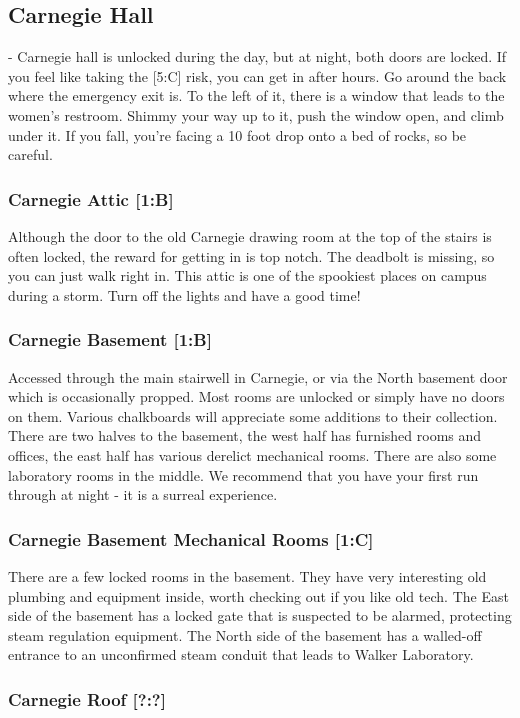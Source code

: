 \documentclass{article}
\begin{document}
\pagebreak
\subsection{Carnegie Hall}
- Carnegie hall is unlocked during the day, but at night, both doors are locked. If you feel like taking the [5:C] risk, you can get in after hours. Go around the back where the emergency exit is. To the left of it, there is a window that leads to the women's restroom. Shimmy your way up to it, push the window open, and climb under it. If you fall, you’re facing a 10 foot drop onto a bed of rocks, so be careful.

\subsubsection{Carnegie Attic [1:B]}
Although the door to the old Carnegie drawing room at the top of the stairs is often locked, the reward for getting in is top notch. The deadbolt is missing, so you can just walk right in. This attic is one of the spookiest places on campus during a storm. Turn off the lights and have a good time!
\subsubsection{Carnegie Basement [1:B]}
Accessed through the main stairwell in Carnegie, or via the North basement door which is occasionally propped. Most rooms are unlocked or simply have no doors on them. Various chalkboards will appreciate some additions to their collection. There are two halves to the basement, the west half has furnished rooms and offices, the east half has various derelict mechanical rooms. There are also some laboratory rooms in the middle. We recommend that you have your first run through at night - it is a surreal experience.
\subsubsection{Carnegie Basement Mechanical Rooms [1:C]}
There are a few locked rooms in the basement. They have very interesting old plumbing and equipment inside, worth checking out if you like old tech. The East side of the basement has a locked gate that is suspected to be alarmed, protecting steam regulation equipment. The North side of the basement has a walled-off entrance to an unconfirmed steam conduit that leads to Walker Laboratory.
\subsubsection{Carnegie Roof [?:?]}
\end{document}
